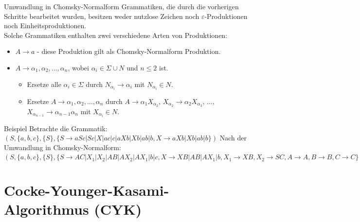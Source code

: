 \documentclass{beamer}
\begin{document}
		\begin{frame}{Umwandlung in Chomsky-Normalform}
			Grammatiken, die durch die vorherigen Schritte bearbeitet wurden, besitzen weder nutzlose Zeichen noch $\varepsilon$-Produktionen noch Einheitsproduktionen.\\
			\pause
			Solche Grammatiken enthalten zwei verschiedene Arten von Produktionen:
			\begin{itemize}
				\item $A \to a$ - diese Produktion gilt als Chomsky-Normalform Produktion.
				\item $A \to \alpha_1, \alpha_2, \ldots ,\alpha_n$, wobei $\alpha_i \in \Sigma \cup N$ und $n \leq 2$ ist.
				\pause
				\begin{itemize}
					\item Ersetze alle $\alpha_i \in \Sigma$ durch $N_{\alpha_i} \to \alpha_i$ mit $N_{\alpha_i} \in N$.
					\item Ersetze $A \to \alpha_1, \alpha_2, \ldots ,\alpha_n$ durch $A \to \alpha_1 X_{\alpha_2}$, $X_{\alpha_2} \to \alpha_2 X_{\alpha_3}$, ..., $X_{\alpha_{n-1}} \to \alpha_{n-1} \alpha_n$ mit $X_{\alpha_i} \in N$.
				\end{itemize}
			\end{itemize}
			
			\pause
			
			\begin{block}{Beispiel}
				Betrachte die Grammatik:\\
				$(S, \{ a, b, c \}, \{ S\}, \{ S \to aSc | Sc | X | ac |  c | aXb | Xb | ab | b, X \to aXb | Xb | ab | b \})$
				Nach der Umwandlung in Chomsky-Normalform:
				$(S, \{ a, b, c \}, \{ S\}, \{ S \to AC|X_1|X_2|AB|AX_2|AX_1|b|c, X \to XB|AB|AX_1|b, X_1 \to XB , X_2 \to SC, A \to A, B \to B,C \to C\})$  
				 
			\end{block}
		\end{frame}
		
	
	\section{Cocke-Younger-Kasami-Algorithmus (CYK)}
	
\end{document}

